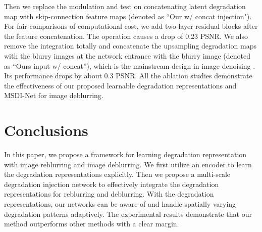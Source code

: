 \documentclass[runningheads]{llncs}
\begin{document}
Then we replace the modulation and test on concatenating latent degradation map with skip-connection feature maps  (denoted as ``Our w/ concat injection").
For fair comparisons of computational cost, we add two-layer residual blocks after the feature concatenation. The operation causes a drop of 0.23 PSNR. We also remove the integration totally and concatenate the upsampling degradation maps with the blurry images at the network entrance with the blurry image (denoted as ``Ours input w/ concat''), which is the mainstream design in image denoising \cite{zhang2018ffdnet,MildenhallKPN18,Guo2019Cbdnet}.
Its performance drops by about 0.3 PSNR. All the ablation studies demonstrate the effectiveness of our proposed learnable degradation representations and MSDI-Net for image deblurring.
\section{Conclusions}
In this paper, we propose a framework for learning degradation representation with image reblurring and image deblurring. 
We first utilize an encoder to learn the degradation representations explicitly. Then we propose a multi-scale degradation injection network to effectively integrate the degradation representations for reblurring and deblurring.
With the degradation representations, our networks can be aware of and handle spatially varying degradation patterns adaptively. The experimental results demonstrate that our method outperforms other methods with a clear margin.





\clearpage


\end{document}
